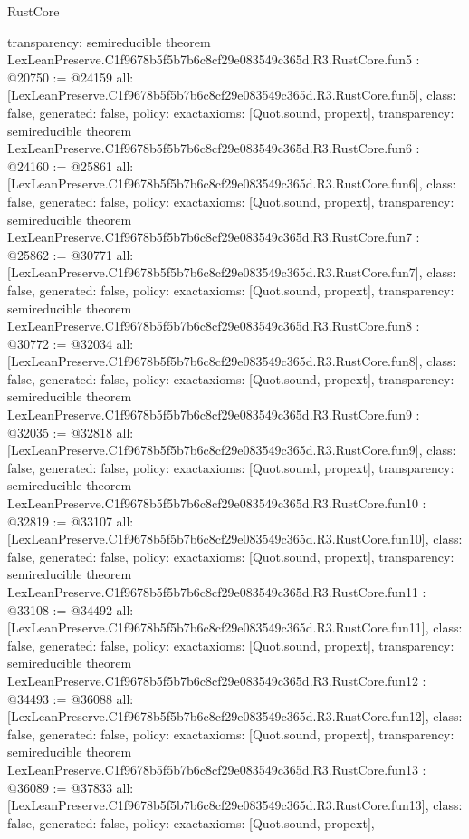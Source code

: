 \begin{lexlean}{RustCore}
\begin{coremodule}
{  transparency: semireducible
}
theorem LexLeanPreserve.C1f9678b5f5b7b6c8cf29e083549c365d.R3.RustCore.fun5 : @20750 := @24159 {
  all: [LexLeanPreserve.C1f9678b5f5b7b6c8cf29e083549c365d.R3.RustCore.fun5],
  class: false,
  generated: false,
  policy: exact{axioms: [Quot.sound, propext]},
  transparency: semireducible
}
theorem LexLeanPreserve.C1f9678b5f5b7b6c8cf29e083549c365d.R3.RustCore.fun6 : @24160 := @25861 {
  all: [LexLeanPreserve.C1f9678b5f5b7b6c8cf29e083549c365d.R3.RustCore.fun6],
  class: false,
  generated: false,
  policy: exact{axioms: [Quot.sound, propext]},
  transparency: semireducible
}
theorem LexLeanPreserve.C1f9678b5f5b7b6c8cf29e083549c365d.R3.RustCore.fun7 : @25862 := @30771 {
  all: [LexLeanPreserve.C1f9678b5f5b7b6c8cf29e083549c365d.R3.RustCore.fun7],
  class: false,
  generated: false,
  policy: exact{axioms: [Quot.sound, propext]},
  transparency: semireducible
}
theorem LexLeanPreserve.C1f9678b5f5b7b6c8cf29e083549c365d.R3.RustCore.fun8 : @30772 := @32034 {
  all: [LexLeanPreserve.C1f9678b5f5b7b6c8cf29e083549c365d.R3.RustCore.fun8],
  class: false,
  generated: false,
  policy: exact{axioms: [Quot.sound, propext]},
  transparency: semireducible
}
theorem LexLeanPreserve.C1f9678b5f5b7b6c8cf29e083549c365d.R3.RustCore.fun9 : @32035 := @32818 {
  all: [LexLeanPreserve.C1f9678b5f5b7b6c8cf29e083549c365d.R3.RustCore.fun9],
  class: false,
  generated: false,
  policy: exact{axioms: [Quot.sound, propext]},
  transparency: semireducible
}
theorem LexLeanPreserve.C1f9678b5f5b7b6c8cf29e083549c365d.R3.RustCore.fun10 : @32819 := @33107 {
  all: [LexLeanPreserve.C1f9678b5f5b7b6c8cf29e083549c365d.R3.RustCore.fun10],
  class: false,
  generated: false,
  policy: exact{axioms: [Quot.sound, propext]},
  transparency: semireducible
}
theorem LexLeanPreserve.C1f9678b5f5b7b6c8cf29e083549c365d.R3.RustCore.fun11 : @33108 := @34492 {
  all: [LexLeanPreserve.C1f9678b5f5b7b6c8cf29e083549c365d.R3.RustCore.fun11],
  class: false,
  generated: false,
  policy: exact{axioms: [Quot.sound, propext]},
  transparency: semireducible
}
theorem LexLeanPreserve.C1f9678b5f5b7b6c8cf29e083549c365d.R3.RustCore.fun12 : @34493 := @36088 {
  all: [LexLeanPreserve.C1f9678b5f5b7b6c8cf29e083549c365d.R3.RustCore.fun12],
  class: false,
  generated: false,
  policy: exact{axioms: [Quot.sound, propext]},
  transparency: semireducible
}
theorem LexLeanPreserve.C1f9678b5f5b7b6c8cf29e083549c365d.R3.RustCore.fun13 : @36089 := @37833 {
  all: [LexLeanPreserve.C1f9678b5f5b7b6c8cf29e083549c365d.R3.RustCore.fun13],
  class: false,
  generated: false,
  policy: exact{axioms: [Quot.sound, propext]},
}
\end{coremodule}
\end{lexlean}

